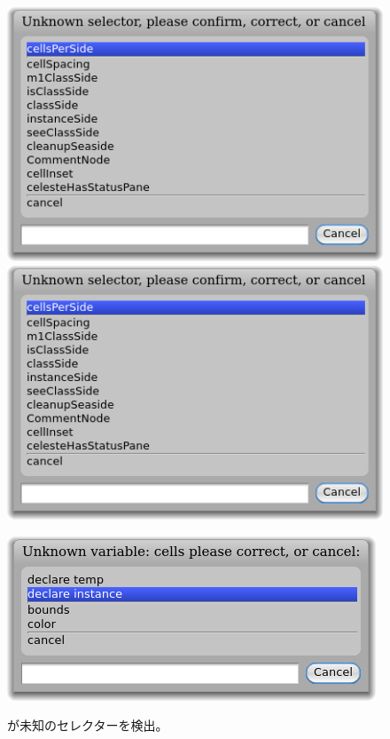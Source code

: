 \documentclass[a4paper,10pt,twoside]{book}
\begin{document}
\begin{figure}[htb]
\begin{minipage}{0.48\textwidth}
	\centering
	\ifluluelse
		{\includegraphics[width=\textwidth]{UnknownSelector}}
		{\includegraphics[scale=0.7]{UnknownSelector}}
	\caption{\pharo が未知のセレクターを検出。}
\end{minipage}
\hfill
\begin{minipage}{0.48\textwidth}
	\centering
	\ifluluelse
		{\includegraphics[width=\textwidth]{DeclareInstanceVar}}

\end{minipage}
\end{figure}
\end{document}
